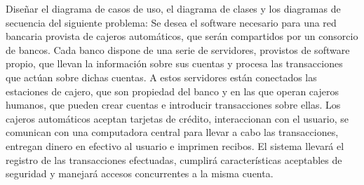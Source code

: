 Diseñar el diagrama de casos de uso, el diagrama de clases y los diagramas de secuencia del siguiente problema: Se desea el software necesario para una red bancaria provista de cajeros automáticos, que serán compartidos por un consorcio de bancos. Cada banco dispone de una serie de servidores, provistos de software propio, que llevan la información sobre sus cuentas y procesa las transacciones que actúan sobre dichas cuentas. A estos servidores están conectados las estaciones de cajero, que son propiedad del banco y en las que operan cajeros humanos, que pueden crear cuentas e introducir transacciones sobre ellas. Los cajeros automáticos aceptan tarjetas de crédito, interaccionan con el usuario, se comunican con una computadora central para llevar a cabo las transacciones, entregan dinero en efectivo al usuario e imprimen recibos. El sistema llevará el registro de las transacciones efectuadas, cumplirá características aceptables de seguridad y manejará accesos concurrentes a la misma cuenta.
